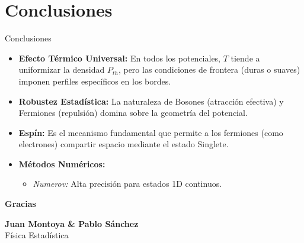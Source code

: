 \documentclass[aspectratio=169]{beamer}
\begin{document}
\section{Conclusiones}
\begin{frame}{Conclusiones}
\begin{itemize}
\item \textbf{Efecto Térmico Universal:} En todos los potenciales, $T$ tiende a uniformizar la densidad $P_{th}$, pero las condiciones de frontera (duras o suaves) imponen perfiles específicos en los bordes.
\item \textbf{Robustez Estadística:} La naturaleza de Bosones (atracción efectiva) y Fermiones (repulsión) domina sobre la geometría del potencial.
\item \textbf{Espín:} Es el mecanismo fundamental que permite a los fermiones (como electrones) compartir espacio mediante el estado Singlete.
\item \textbf{Métodos Numéricos:}
    \begin{itemize}
        \item \textit{Numerov:} Alta precisión para estados 1D continuos.
    \end{itemize}
\end{itemize}

\vspace{0.3cm}

\end{frame}

\begin{frame}[plain]
\begin{center}
\Huge{\textcolor{udea}{\textbf{Gracias}}}

\vspace{1cm}
\normalsize
\textbf{Juan Montoya \& Pablo Sánchez}\\
Física Estadística
\end{center}
\end{frame}
\end{document}
